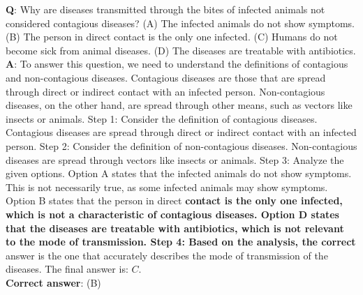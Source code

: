 \begin{tcolorbox}[colback=blue!5!white,colframe=blue!75!black,title=ARC Easy example (\llamainstruct)]
\textbf{Q}:  Why are diseases transmitted through the bites of infected animals not considered contagious diseases? (A) The infected animals do not show symptoms. (B) The person in direct contact is the only one infected. (C) Humans do not become sick from animal diseases. (D) The diseases are treatable with antibiotics.\\

\textbf{A}: To answer this question, we need to understand the definitions of contagious and non-contagious diseases. Contagious diseases are those that are spread through direct or indirect contact with an infected person. Non-contagious diseases, on the other hand, are spread through other means, such as vectors like insects or animals. Step 1: Consider the definition of contagious diseases. Contagious diseases are spread through direct or indirect contact with an infected person. Step 2: Consider the definition of non-contagious diseases. Non-contagious diseases are spread through vectors like insects or animals. Step 3: Analyze the given options. Option A states that the infected animals do not show symptoms. This is not necessarily true, as some infected animals may show symptoms. Option B states that the person in direct\textbf{ contact is the only one infected, which is not a characteristic of contagious diseases. Option D states that the diseases are treatable with antibiotics, which is not relevant to the mode of transmission. Step 4: Based on the analysis, the correct} answer is the one that accurately describes the mode of transmission of the diseases. The final answer is: $\boxed{C}$. \\

\textbf{Correct answer}: (B)
\end{tcolorbox}


